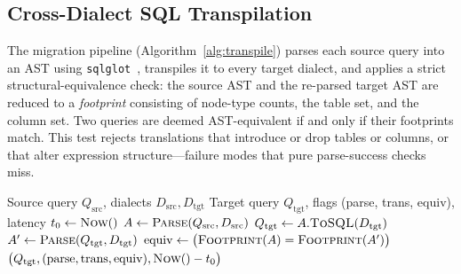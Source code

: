 \documentclass{ieeeaccess}
\begin{document}
\subsection{Cross-Dialect SQL Transpilation}

The migration pipeline (Algorithm~\ref{alg:transpile}) parses each source query
into an AST using \texttt{sqlglot}~\cite{mao2024sqlglot}, transpiles it to every
target dialect, and applies a strict structural-equivalence check: the source AST
and the re-parsed target AST are reduced to a \emph{footprint} consisting of
node-type counts, the table set, and the column set. Two queries are deemed
AST-equivalent if and only if their footprints match. This test rejects
translations that introduce or drop tables or columns, or that alter expression
structure---failure modes that pure parse-success checks miss.

\begin{algorithm}[tbp]
\caption{AST-Footprint-Verified Transpilation}
\label{alg:transpile}
\begin{algorithmic}[1]
\Require Source query $Q_{\mathrm{src}}$, dialects $D_{\mathrm{src}}, D_{\mathrm{tgt}}$
\Ensure Target query $Q_{\mathrm{tgt}}$, flags (parse, trans, equiv), latency
\State $t_0 \gets \textsc{Now}()$
\State $A \gets \textsc{Parse}(Q_{\mathrm{src}}, D_{\mathrm{src}})$
\State $Q_{\mathrm{tgt}} \gets A.\textsc{ToSQL}(D_{\mathrm{tgt}})$
\State $A' \gets \textsc{Parse}(Q_{\mathrm{tgt}}, D_{\mathrm{tgt}})$
\State $\mathrm{equiv} \gets \big(\textsc{Footprint}(A) = \textsc{Footprint}(A')\big)$
\State \Return $\big(Q_{\mathrm{tgt}}, (\mathrm{parse}, \mathrm{trans}, \mathrm{equiv}), \textsc{Now}() - t_0\big)$
\end{algorithmic}
\end{algorithm}
\end{document}
